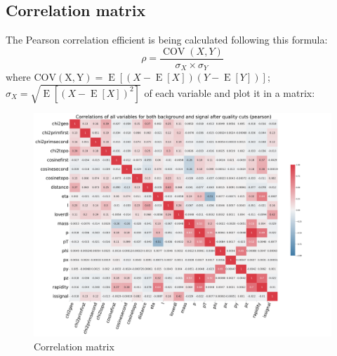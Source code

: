 \documentclass[12pt,a4paper]{report}
\begin{document}
\subsection{Correlation matrix}
The Pearson correlation efficient is being calculated following this formula:
\begin{equation}
    \rho = \frac{\operatorname{COV}(X, Y)}{\sigma_X \times \sigma_Y}
\end{equation}
where $\operatorname{COV(X, Y)} = \operatorname{E}\left[\left(X - \operatorname{E}\left[X\right]\right) \left(Y - \operatorname{E}\left[Y\right]\right)\right]$; $\sigma_X = \sqrt{\operatorname{E}\left[\left(X - \operatorname{E}\left[X\right]\right)^2\right]}$
of each variable and plot it in a matrix:

\begin{figure}[H]
    \centering
    \includegraphics[width=1.2\textwidth]{images/Correlations_of_all_variables_for_both_background_and_signal_after_quality_cuts_(pearson).pdf}
    \caption{Correlation matrix}
\end{figure}
\end{document}
